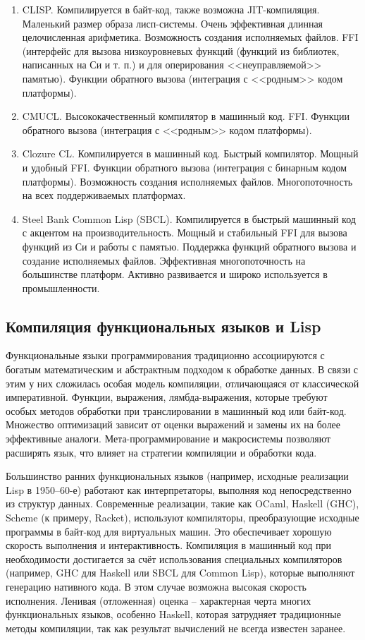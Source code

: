 \begin{enumerate}
\item CLISP. Компилируется в байт-код, также возможна JIT-компиляция. Маленький размер образа лисп-системы. Очень эффективная длинная целочисленная арифметика. Возможность создания исполняемых файлов. FFI (интерфейс для вызова низкоуровневых функций (функций из библиотек, написанных на Си и т. п.) и для оперирования <<неуправляемой>> памятью). Функции обратного вызова (интеграция с <<родным>> кодом платформы).
\item CMUCL. Высококачественный компилятор в машинный код. FFI. Функции обратного вызова (интеграция с <<родным>> кодом платформы).
\item Clozure CL. Компилируется в машинный код. Быстрый компилятор. Мощный и удобный FFI. Функции обратного вызова (интеграция с бинарным кодом платформы). Возможность создания исполняемых файлов. Многопоточность на всех поддерживаемых платформах.
\item Steel Bank Common Lisp (SBCL). Компилируется в быстрый машинный код с акцентом на производительность. Мощный и стабильный FFI для вызова функций из Си и работы с памятью. Поддержка функций обратного вызова и создание исполняемых файлов. Эффективная многопоточность на большинстве платформ. Активно развивается и широко используется в промышленности.
\end{enumerate}

\subsection{Компиляция функциональных языков и Lisp}

Функциональные языки программирования традиционно ассоциируются с богатым математическим и абстрактным подходом к обработке данных. В связи с этим у них сложилась особая модель компиляции, отличающаяся от классической императивной. Функции, выражения, лямбда-выражения, которые требуют особых методов обработки при транслировании в машинный код или байт-код. Множество оптимизаций зависит от оценки выражений и замены их на более эффективные аналоги. Мета-программирование и макросистемы позволяют расширять язык, что влияет на стратегии компиляции и обработки кода.

Большинство ранних функциональных языков (например, исходные реализации Lisp в 1950–60-е) работают как интерпретаторы, выполняя код непосредственно из структур данных. Современные реализации, такие как OCaml, Haskell (GHC), Scheme (к примеру, Racket), используют компиляторы, преобразующие исходные программы в байт-код для виртуальных машин. Это обеспечивает хорошую скорость выполнения и интерактивность. Компиляция в машинный код при необходимости достигается за счёт использования специальных компиляторов (например, GHC для Haskell или SBCL для Common Lisp), которые выполняют генерацию нативного кода. В этом случае возможна высокая скорость исполнения. Ленивая (отложенная) оценка -- характерная черта многих функциональных языков, особенно Haskell, которая затрудняет традиционные методы компиляции, так как результат вычислений не всегда известен заранее.


